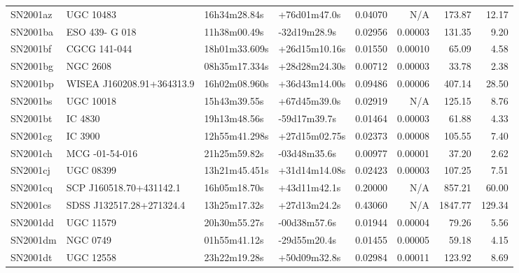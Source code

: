 \begin{longtable}{llllrrrr}
SN2001az         &                       UGC 10483 &    16h34m28.84s &    +76d01m47.0s &  0.04070 &      N/A &   173.87 &       12.17 \\
SN2001ba         &                  ESO 439- G 018 &    11h38m00.49s &    -32d19m28.9s &  0.02956 &  0.00003 &   131.35 &        9.20 \\
SN2001bf         &                    CGCG 141-044 &   18h01m33.609s &   +26d15m10.16s &  0.01550 &  0.00010 &    65.09 &        4.58 \\
SN2001bg         &                        NGC 2608 &   08h35m17.334s &   +28d28m24.30s &  0.00712 &  0.00003 &    33.78 &        2.38 \\
SN2001bp         &       WISEA J160208.91+364313.9 &   16h02m08.960s &   +36d43m14.00s &  0.09486 &  0.00006 &   407.14 &       28.50 \\
SN2001bs         &                       UGC 10018 &    15h43m39.55s &    +67d45m39.0s &  0.02919 &      N/A &   125.15 &        8.76 \\
SN2001bt         &                         IC 4830 &    19h13m48.56s &    -59d17m39.7s &  0.01464 &  0.00003 &    61.88 &        4.33 \\
SN2001cg         &                         IC 3900 &   12h55m41.298s &   +27d15m02.75s &  0.02373 &  0.00008 &   105.55 &        7.40 \\
SN2001ch         &                  MCG -01-54-016 &    21h25m59.82s &    -03d48m35.6s &  0.00977 &  0.00001 &    37.20 &        2.62 \\
SN2001cj         &                       UGC 08399 &   13h21m45.451s &   +31d14m14.08s &  0.02423 &  0.00003 &   107.25 &        7.51 \\
SN2001cq         &         SCP J160518.70+431142.1 &    16h05m18.70s &    +43d11m42.1s &  0.20000 &      N/A &   857.21 &       60.00 \\
SN2001cs         &        SDSS J132517.28+271324.4 &    13h25m17.32s &    +27d13m24.2s &  0.43060 &      N/A &  1847.77 &      129.34 \\
SN2001dd         &                       UGC 11579 &    20h30m55.27s &    -00d38m57.6s &  0.01944 &  0.00004 &    79.26 &        5.56 \\
SN2001dm         &                        NGC 0749 &    01h55m41.12s &    -29d55m20.4s &  0.01455 &  0.00005 &    59.18 &        4.15 \\
SN2001dt         &                       UGC 12558 &    23h22m19.28s &    +50d09m32.8s &  0.02984 &  0.00011 &   123.92 &        8.69 \\

\end{longtable}
